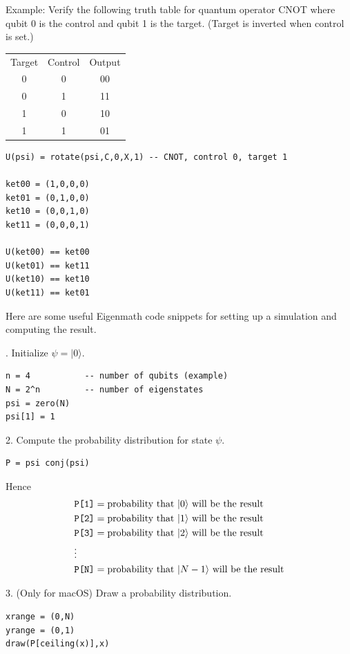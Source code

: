 \documentclass[12pt]{article}
\begin{document}
Example:
Verify the following truth table for quantum operator CNOT
where qubit 0 is the control and qubit 1 is the target.
(Target is inverted when control is set.)
\begin{center}
\begin{tabular}{ccc}
Target & Control & Output \\
0 & 0 & 00 \\
0 & 1 & 11 \\
1 & 0 & 10 \\
1 & 1 & 01
\end{tabular}
\end{center}

{\color{blue}
\begin{verbatim}
U(psi) = rotate(psi,C,0,X,1) -- CNOT, control 0, target 1

ket00 = (1,0,0,0)
ket01 = (0,1,0,0)
ket10 = (0,0,1,0)
ket11 = (0,0,0,1)

U(ket00) == ket00
U(ket01) == ket11
U(ket10) == ket10
U(ket11) == ket01
\end{verbatim}
}

Here are some useful Eigenmath code snippets for setting up a simulation
and computing the result.

. Initialize $\psi=|0\rangle$.
{\color{blue}
\begin{verbatim}
n = 4           -- number of qubits (example)
N = 2^n         -- number of eigenstates
psi = zero(N)
psi[1] = 1
\end{verbatim}
}

2. Compute the probability distribution for state $\psi$.
{\color{blue}
\begin{verbatim}
P = psi conj(psi)
\end{verbatim}
}

Hence
\begin{align*}
&\text{\tt P[1]}=\text{probability that $|0\rangle$ will be the result}
\\
&\text{\tt P[2]}=\text{probability that $|1\rangle$ will be the result}
\\
&\text{\tt P[3]}=\text{probability that $|2\rangle$ will be the result}
\\
&\vdots
\\
&\text{\tt P[N]}=\text{probability that $|N-1\rangle$ will be the result}
\end{align*}

3. (Only for macOS) Draw a probability distribution.
{\color{blue}
\begin{verbatim}
xrange = (0,N)
yrange = (0,1)
draw(P[ceiling(x)],x)
\end{verbatim}
}
\end{document}
